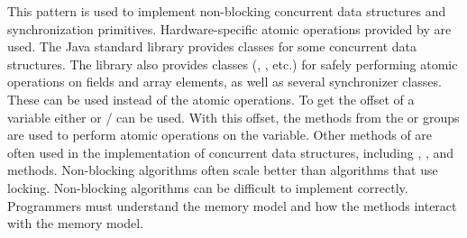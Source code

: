 %
{
  This pattern is used to implement
  non-blocking concurrent data structures and synchronization primitives.
  Hardware-specific atomic operations
  provided by \smu{} are used.
}
{The Java standard library provides classes for some concurrent data structures.
The library also provides classes
(, , etc.)
for safely performing atomic operations on fields and array elements, as well
as several synchronizer classes. These
can be used instead of the \unsafe{} atomic operations.}
{To get the offset of a \java{} variable either  or
  / can be used.
With this offset, the methods from the  or  groups are used to perform atomic operations on the variable.
Other methods of \unsafe{} are often used in the implementation of concurrent
data structures, including , , and  methods.
}
{Non-blocking algorithms often scale better than algorithms that use locking.}
{Non-blocking algorithms can be difficult to implement correctly. Programmers
must understand the \java{} memory model and how the \unsafe{} methods interact
with the memory model.}

\newcommand\foundinfence{198}
\newcommand\usedbyfence{9795}
\newcommand\mostusedfence{\fencemost}
\newcommand\membersfence{Methods of the \smugroup{Fence} group, or methods of
the \smugroup{Get/Put Volatile} groups or \smugroup{Put Ordered} group}
\newcommand\namefence{Strongly Consistent Shared Variables}


